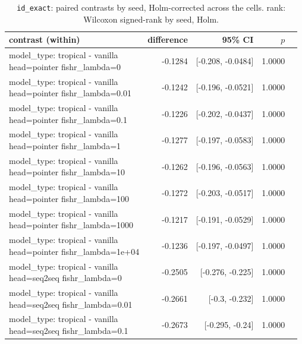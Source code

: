 \documentclass[10pt]{article}
\makeatletter
\newcommand{\stackcell}[1]{\begin{tabular}[t]{@{}l@{}}#1\end{tabular}}
\makeatother
\begin{document}
{\small
\begin{longtable}{lrrrl}
\caption{\texttt{id\_exact}: paired contrasts by seed, Holm-corrected across the cells. rank: Wilcoxon signed-rank by seed, Holm.}\label{tab:paired-id_exact}\\
\toprule
contrast (within) & difference & 95\% CI & $p$ & \\
\midrule
\endhead
\stackcell{model\_type: tropical - vanilla\\\footnotesize head=pointer fishr\_lambda=0 } & -0.1284 & [-0.208, -0.0484] & 1.0000 & \\
\stackcell{model\_type: tropical - vanilla\\\footnotesize head=pointer fishr\_lambda=0.01 } & -0.1242 & [-0.196, -0.0521] & 1.0000 & \\
\stackcell{model\_type: tropical - vanilla\\\footnotesize head=pointer fishr\_lambda=0.1 } & -0.1226 & [-0.202, -0.0437] & 1.0000 & \\
\stackcell{model\_type: tropical - vanilla\\\footnotesize head=pointer fishr\_lambda=1 } & -0.1277 & [-0.197, -0.0583] & 1.0000 & \\
\stackcell{model\_type: tropical - vanilla\\\footnotesize head=pointer fishr\_lambda=10 } & -0.1262 & [-0.196, -0.0563] & 1.0000 & \\
\stackcell{model\_type: tropical - vanilla\\\footnotesize head=pointer fishr\_lambda=100 } & -0.1272 & [-0.203, -0.0517] & 1.0000 & \\
\stackcell{model\_type: tropical - vanilla\\\footnotesize head=pointer fishr\_lambda=1000 } & -0.1217 & [-0.191, -0.0529] & 1.0000 & \\
\stackcell{model\_type: tropical - vanilla\\\footnotesize head=pointer fishr\_lambda=1e+04 } & -0.1236 & [-0.197, -0.0497] & 1.0000 & \\
\stackcell{model\_type: tropical - vanilla\\\footnotesize head=seq2seq fishr\_lambda=0 } & -0.2505 & [-0.276, -0.225] & 1.0000 & \\
\stackcell{model\_type: tropical - vanilla\\\footnotesize head=seq2seq fishr\_lambda=0.01 } & -0.2661 & [-0.3, -0.232] & 1.0000 & \\
\stackcell{model\_type: tropical - vanilla\\\footnotesize head=seq2seq fishr\_lambda=0.1 } & -0.2673 & [-0.295, -0.24] & 1.0000 & \\

\end{longtable}}
\end{document}
